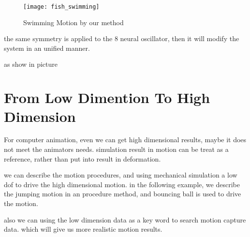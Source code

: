 \begin{figure}[!htbp]
  \begin{center}
      \texttt{[image: fish\_swimming]}
    \caption{Swimming Motion by our method}
    \label{fig:fishswimming}
\end{center}
\end{figure}




the same symmetry is applied to the 8 neural oscillator, then it will modify the system in an unified manner.

as show in picture



\section{From Low Dimention To High Dimension}

For computer animation, even we can get high dimensional results, maybe it does not meet the animators needs.
simulation result in motion can be treat as a reference, rather than put into result in deformation.

we can describe the motion procedures, and using mechanical simulation a low dof to drive the high dimensional motion.
in the following example,
we describe the jumping motion in an procedure method,
and bouncing ball is used to drive the motion.


also we can using the low dimension data as a key word to search motion capture data.
which will give us more realistic motion results.



